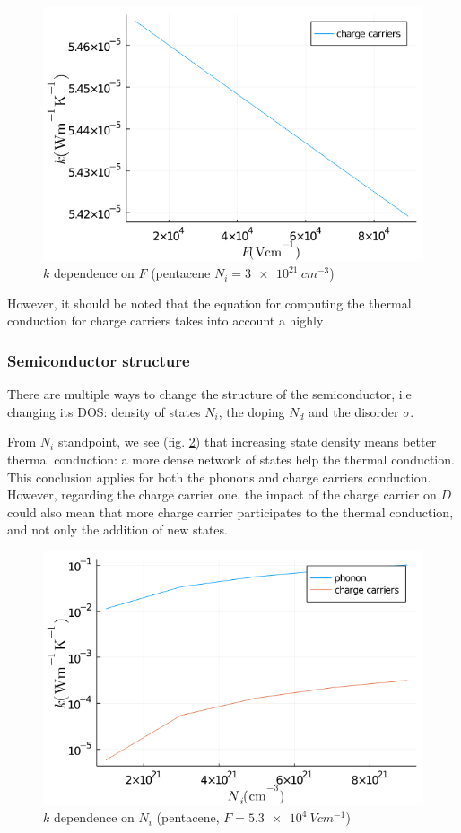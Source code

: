 \begin{figure}[!h]
    \centering
    \includegraphics*[width=.5\paperwidth]{figures/4_thermal/k_field.png}
    \caption{$k$ dependence on $F$ (pentacene $N_i = \SI{3e21}{cm^{-3}}$)\label{fig:4_11}}
\end{figure}

However, it should be noted that the equation for computing the thermal conduction for charge carriers takes into account a highly

\subsubsection{Semiconductor structure}

There are multiple ways to change the structure of the semiconductor, i.e changing its DOS: density of states $N_i$, the doping $N_d$ and the disorder $\sigma$.

From $N_i$ standpoint, we see (fig. \ref{fig:4_12}) that increasing state density means better thermal conduction: a more dense network of states help the thermal conduction. This conclusion applies for both the phonons and charge carriers conduction. However, regarding the charge carrier one, the impact of the charge carrier on $D$ could also mean that more charge carrier participates to the thermal conduction, and not only the addition of new states.

\begin{figure}[!h]
    \centering
    \includegraphics*[width=.5\paperwidth]{figures/4_thermal/k_ni.png}
    \caption{$k$ dependence on $N_i$ (pentacene, $F = \SI{5.3e4}{V cm^{-1}}$)\label{fig:4_12}}
\end{figure}